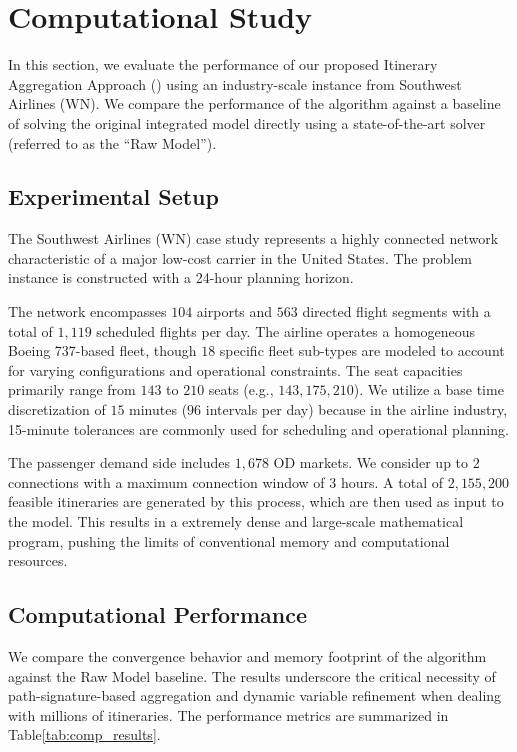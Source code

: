 \chapter{Computational Study}
\label{sec:comp_study}

In this section, we evaluate the performance of our proposed Itinerary Aggregation Approach (\algoNotation) using an industry-scale instance from Southwest Airlines (WN). We compare the performance of the \algoNotation algorithm against a baseline of solving the original integrated model directly using a state-of-the-art solver (referred to as the ``Raw Model'').

\section{Experimental Setup}
The Southwest Airlines (WN) case study represents a highly connected network characteristic of a major low-cost carrier in the United States. The problem instance is constructed with a 24-hour planning horizon.

The network encompasses $104$ airports and $563$ directed flight segments with a total of $1,119$ scheduled flights per day. The airline operates a homogeneous Boeing 737-based fleet, though $18$ specific fleet sub-types are modeled to account for varying configurations and operational constraints. The seat capacities primarily range from $143$ to $210$ seats (e.g., $143, 175, 210$). 
We utilize a base time discretization of $15$ minutes ($96$ intervals per day) because in the airline industry, 15-minute tolerances are commonly used for scheduling and operational planning.

The passenger demand side includes $1,678$ OD markets. We consider up to $2$ connections with a maximum connection window of $3$ hours. A total of $2,155,200$ feasible itineraries are generated by this process, which are then used as input to the model. This results in a extremely dense and large-scale mathematical program, pushing the limits of conventional memory and computational resources.

\section{Computational Performance}
We compare the convergence behavior and memory footprint of the \algoNotation algorithm against the Raw Model baseline. The results underscore the critical necessity of path-signature-based aggregation and dynamic variable refinement when dealing with millions of itineraries. The performance metrics are summarized in Table\ref{tab:comp_results}.

